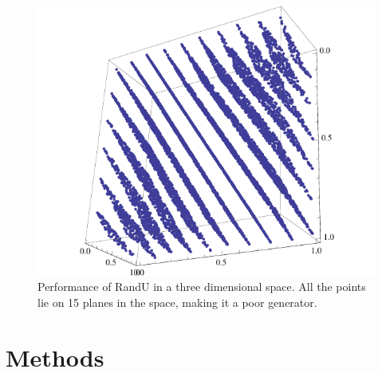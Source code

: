 \documentclass[10pt,a4paper]{article}
\begin{document}
\begin{figure}[H]
  \centering
  \includegraphics[scale=0.6]{randU.pdf}
  \caption{Performance of RandU in a three dimensional space. All the points lie on 15 planes in the space, making it a poor generator.}
  \label{fig:randU}
\end{figure}

\section{Methods}
\end{document}
